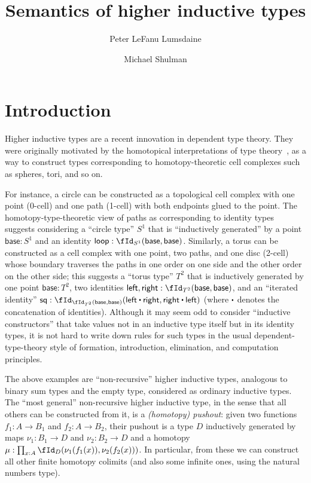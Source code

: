 \documentclass{amsart}
\title{Semantics of higher inductive types}
\author{Peter LeFanu Lumsdaine}
\author{Michael Shulman}
\begin{document}
\maketitle
\tableofcontents

\section{Introduction}
\label{sec:introduction}

Higher inductive types are a recent innovation in dependent type theory.
They were originally motivated by the homotopical interpretations of type theory~\cite{aw:htpy-idtype,klv:ssetmodel,hottbook}, as a way to construct types corresponding to homotopy-theoretic cell complexes such as spheres, tori, and so on.

For instance, a circle can be constructed as a topological cell complex with one point (0-cell) and one path (1-cell) with both endpoints glued to the point.
The homotopy-type-theoretic view of paths as corresponding to identity types suggests considering a ``circle type'' $S^1$ that is ``inductively generated'' by a point $\mathsf{base}:S^1$ and an identity $\mathsf{loop}: \id[S^1]{\mathsf{base}}{\mathsf{base}}$.
Similarly, a torus can be constructed as a cell complex with one point, two paths, and one disc (2-cell) whose boundary traverses the paths in one order on one side and the other order on the other side; this suggests a ``torus type'' $T^2$ that is inductively generated by one point $\mathsf{base}:T^2$, two identities $\mathsf{left},\mathsf{right}:\id[T^2]{\mathsf{base}}{\mathsf{base}}$, and an ``iterated identity'' $\mathsf{sq} : \id[{\id[T^2]{\mathsf{base}}{\mathsf{base}}}]{\mathsf{left}\ct\mathsf{right}}{\mathsf{right}\ct\mathsf{left}}$ (where $\ct$ denotes the concatenation of identities).
Although it may seem odd to consider ``inductive constructors'' that take values not in an inductive type itself but in its identity types, it is not hard to write down rules for such types in the usual dependent-type-theory style of formation, introduction, elimination, and computation principles.

The above examples are ``non-recursive'' higher inductive types, analogous to binary sum types and the empty type, considered as ordinary inductive types.
The ``most general'' non-recursive higher inductive type, in the sense that all others can be constructed from it, is a \emph{(homotopy) pushout}: given two functions $f_1:A\to B_1$ and $f_2:A\to B_2$, their pushout is a type $D$ inductively generated by maps $\nu_1:B_1\to D$ and $\nu_2:B_2\to D$ and a homotopy $\mu:\prod_{x:A} \id[D]{\nu_1(f_1(x))}{\nu_2(f_2(x))}$.
In particular, from these we can construct all other finite homotopy colimits (and also some infinite ones, using the natural numbers type).
\end{document}

